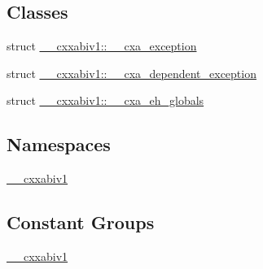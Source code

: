 \subsection*{Classes}
\begin{DoxyCompactItemize}
\item 
struct \hyperlink{struct____cxxabiv1_1_1____cxa__exception}{\-\_\-\-\_\-cxxabiv1\-::\-\_\-\-\_\-cxa\-\_\-exception}
\item 
struct \hyperlink{struct____cxxabiv1_1_1____cxa__dependent__exception}{\-\_\-\-\_\-cxxabiv1\-::\-\_\-\-\_\-cxa\-\_\-dependent\-\_\-exception}
\item 
struct \hyperlink{struct____cxxabiv1_1_1____cxa__eh__globals}{\-\_\-\-\_\-cxxabiv1\-::\-\_\-\-\_\-cxa\-\_\-eh\-\_\-globals}
\end{DoxyCompactItemize}
\subsection*{Namespaces}
\begin{DoxyCompactItemize}
\item 
\hyperlink{namespace____cxxabiv1}{\-\_\-\-\_\-cxxabiv1}
\end{DoxyCompactItemize}
\subsection*{Constant Groups}
\begin{DoxyCompactItemize}
\item 
\hyperlink{namespace____cxxabiv1}{\-\_\-\-\_\-cxxabiv1}
\end{DoxyCompactItemize}
